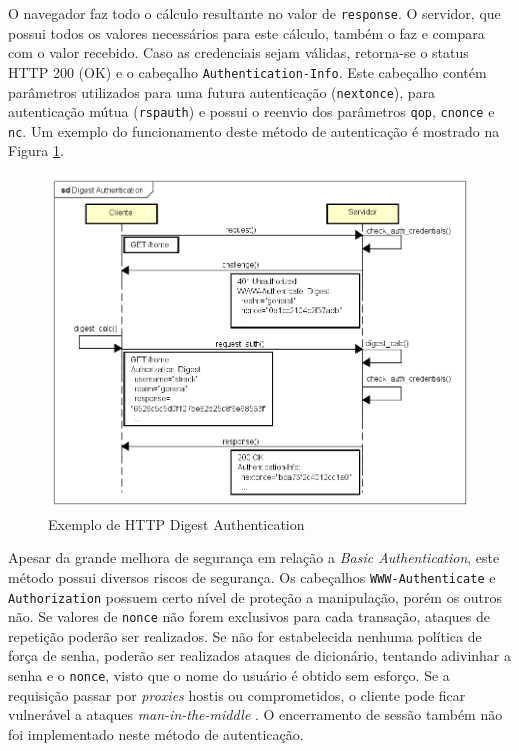 \documentclass[12pt]{article}
\begin{document}
O navegador faz todo o cálculo resultante no valor de \texttt{response}. O servidor, que possui 
todos os valores necessários para este cálculo, também o faz e compara com o valor recebido. Caso 
as credenciais sejam válidas, retorna-se o status HTTP 200 (OK) e o cabeçalho 
\texttt{Authentication-Info}. Este cabeçalho contém parâmetros utilizados para uma futura 
autenticação (\texttt{nextonce}), para autenticação mútua (\texttt{rspauth}) e possui o reenvio dos 
parâmetros \texttt{qop}, \texttt{cnonce} e \texttt{nc}. Um exemplo do funcionamento deste método de 
autenticação é mostrado na Figura \ref{fig:digestAuth}.

\begin{figure}[ht]
  \centering
  \includegraphics[width=1\textwidth]{Digest Authentication (Simplified).png}
  \caption{Exemplo de HTTP Digest Authentication}
  \label{fig:digestAuth}
\end{figure}

Apesar da grande melhora de segurança em relação a \emph{Basic Authentication}, este método possui 
diversos riscos de segurança. Os cabeçalhos \texttt{WWW-Authenticate} e \texttt{Authorization} 
possuem certo nível de proteção a manipulação, porém os outros não. Se valores de \texttt{nonce} 
não forem exclusivos para cada transação, ataques de repetição poderão ser realizados. Se não for 
estabelecida nenhuma política de força de senha, poderão ser realizados ataques de dicionário, 
tentando adivinhar a senha e o \texttt{nonce}, visto que o nome do usuário é obtido sem esforço.
Se a requisição passar por \emph{proxies} hostis ou comprometidos, o cliente pode ficar vulnerável 
a ataques \emph{man-in-the-middle} \cite{GOURLEY2002}. O encerramento de sessão também não foi 
implementado neste método de autenticação.
\end{document}

